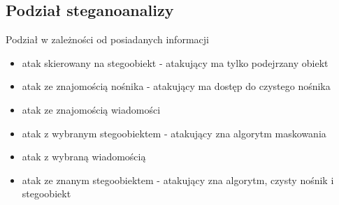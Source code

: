 \documentclass{article}
\begin{document}
\subsection{Podział steganoanalizy}
Podział w zależności od posiadanych informacji
\begin{itemize}
	\item atak skierowany na stegoobiekt  - atakujący ma tylko podejrzany obiekt
	\item atak ze znajomością nośnika - atakujący ma dostęp do czystego nośnika
	\item atak ze znajomością wiadomości
	\item atak z wybranym stegoobiektem - atakujący zna algorytm maskowania
	\item atak z wybraną wiadomością
	\item atak ze znanym stegoobiektem - atakujący zna algorytm, czysty nośnik i stegoobiekt
\end{itemize}
\end{document}
